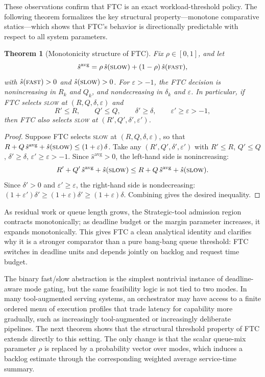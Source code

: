 \documentclass[fleqn,12pt,lineno]{wlpeerj}
\newtheorem{theorem}{Theorem}[section]
\begin{document}
These observations confirm that FTC is an exact workload-threshold policy. The following theorem formalizes the key structural property---monotone comparative statics---which shows that FTC's behavior is directionally predictable with respect to all system parameters.

\begin{theorem}[Monotonicity structure of FTC]
\label{thm:ftc_structure}
Fix $\rho\in[0,1]$, and let
\[
\hat{s}^{\mathrm{avg}} = \rho\,\hat{s}(\textsc{slow}) + (1-\rho)\,\hat{s}(\textsc{fast}),
\]
with $\hat{s}(\textsc{fast})>0$ and $\hat{s}(\textsc{slow})>0$. For $\varepsilon > -1$, the FTC decision is nonincreasing in $R_k$ and $Q_k$, and nondecreasing in $\delta_k$ and $\varepsilon$. In particular, if FTC selects \textsc{slow} at $(R,Q,\delta,\varepsilon)$ and
\[
R' \le R,\qquad Q' \le Q,\qquad \delta' \ge \delta,\qquad \varepsilon' \ge \varepsilon > -1,
\]
then FTC also selects \textsc{slow} at $(R',Q',\delta',\varepsilon')$.
\end{theorem}

\begin{proof}
Suppose FTC selects \textsc{slow} at $(R,Q,\delta,\varepsilon)$, so that
$R + Q\,\hat{s}^{\mathrm{avg}} + \hat{s}(\textsc{slow}) \le (1+\varepsilon)\,\delta$.
Take any $(R',Q',\delta',\varepsilon')$ with $R' \le R$, $Q' \le Q$, $\delta' \ge \delta$, $\varepsilon' \ge \varepsilon > -1$.
Since $\hat{s}^{\mathrm{avg}} > 0$, the left-hand side is nonincreasing:
\[
R' + Q'\,\hat{s}^{\mathrm{avg}} + \hat{s}(\textsc{slow}) \le R + Q\,\hat{s}^{\mathrm{avg}} + \hat{s}(\textsc{slow}).
\]
Since $\delta' > 0$ and $\varepsilon' \ge \varepsilon$, the right-hand side is nondecreasing:
$(1+\varepsilon')\delta' \ge (1+\varepsilon)\delta' \ge (1+\varepsilon)\delta$.
Combining gives the desired inequality.
\end{proof}

As residual work or queue length grows, the Strategic-tool admission region contracts monotonically; as deadline budget or the margin parameter increases, it expands monotonically. This gives FTC a clean analytical identity and clarifies why it is a stronger comparator than a pure bang-bang queue threshold: FTC switches in deadline units and depends jointly on backlog and request time budget.

The binary fast/slow abstraction is the simplest nontrivial instance of deadline-aware mode gating, but the same feasibility logic is not tied to two modes. In many tool-augmented serving systems, an orchestrator may have access to a finite ordered menu of execution profiles that trade latency for capability more gradually, such as increasingly tool-augmented or increasingly deliberate pipelines. The next theorem shows that the structural threshold property of FTC extends directly to this setting. The only change is that the scalar queue-mix parameter $\rho$ is replaced by a probability vector over modes, which induces a backlog estimate through the corresponding weighted average service-time summary.
\end{document}
